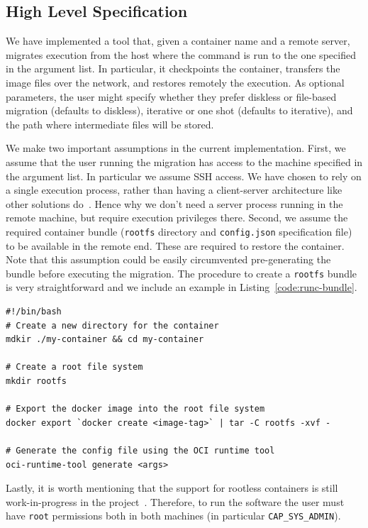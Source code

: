 \subsection{High Level Specification}

We have implemented a tool that, given a container name and a remote server, migrates execution from the host where the command is run to the one specified in the argument list.
In particular, it checkpoints the container, transfers the image files over the network, and restores remotely the execution.
As optional parameters, the user might specify whether they prefer diskless or file-based migration (defaults to diskless), iterative or one shot (defaults to iterative), and the path where intermediate files will be stored.

We make two important assumptions in the current implementation.
First, we assume that the user running the migration has access to the machine specified in the argument list.
In particular we assume SSH access.
We have chosen to rely on a single execution process, rather than having a client-server architecture like other solutions do~\cite{criu-phaul}.
Hence why we don't need a server process running in the remote machine, but require execution privileges there.
Second, we assume the required container bundle (\texttt{rootfs} directory and \texttt{config.json} specification file) to be available in the remote end.
These are required to restore the container.
Note that this assumption could be easily circumvented pre-generating the bundle before executing the migration.
The procedure to create a \texttt{rootfs} bundle is very straightforward and we include an example in Listing~\ref{code:runc-bundle}.
\begin{lstlisting}[style=Bash,caption={Commands to generate an OCI bundle to run a container using \runc.\label{code:runc-bundle}}]
#!/bin/bash
# Create a new directory for the container
mdkir ./my-container && cd my-container

# Create a root file system
mkdir rootfs

# Export the docker image into the root file system
docker export `docker create <image-tag>` | tar -C rootfs -xvf -

# Generate the config file using the OCI runtime tool
oci-runtime-tool generate <args>
\end{lstlisting}
Lastly, it is worth mentioning that the support for rootless containers is still work-in-progress in the \criu project~\cite{criu-user-mode}.
Therefore, to run the software the user must have \texttt{root} permissions both in both machines (in particular \texttt{CAP\_SYS\_ADMIN}).

